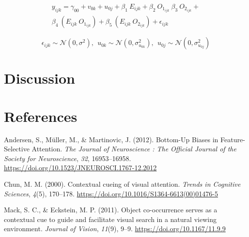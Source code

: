 \documentclass[
  man,floatsintext]{apa7}
\newlength{\cslhangindent}
\newlength{\cslentryspacingunit} %
\newenvironment{CSLReferences}[2] %
 {%
  \setlength{\parindent}{0pt}
  \ifodd #1
  \let\oldpar\par
  \def\par{\hangindent=\cslhangindent\oldpar}
  \fi
  \setlength{\parskip}{#2\cslentryspacingunit}
 }%
 {}
\begin{document}
\begin{equation}
\begin{gathered}
y_{ijk} = \gamma_{00} + v_{0k} + u_{0j} + 
\beta_1~E_{ijk}+ \beta_2~O_{1_{ijk}}~ \beta_3~O_{2_{ijk}} + \\
\beta_4 ~ (E_{ijk}~O_{1_{ijk}}) + \beta_5~(E_{ijk} ~O_{2_{ijk}}) +  
\epsilon_{ijk}
\end{gathered}
\end{equation}

\[\epsilon_{ijk} \sim \mathcal{N}(0, \sigma^2),~~ u_{0k} \sim \mathcal{N}(0, \sigma^2_{u_{0k}}),~~ u_{0j} \sim \mathcal{N}(0, \sigma^2_{u_{0j}})\]

\hypertarget{discussion}{%
\section{Discussion}\label{discussion}}

\newpage

\hypertarget{references}{%
\section{References}\label{references}}

\hypertarget{refs}{}
\begin{CSLReferences}{1}{0}
\leavevmode{}%
Andersen, S., Müller, M., \& Martinovic, J. (2012). Bottom-{Up} {Biases} in {Feature}-{Selective} {Attention}. \emph{The Journal of Neuroscience : The Official Journal of the Society for Neuroscience}, \emph{32}, 16953--16958. \url{https://doi.org/10.1523/JNEUROSCI.1767-12.2012}

\leavevmode{}%
Chun, M. M. (2000). Contextual cueing of visual attention. \emph{Trends in Cognitive Sciences}, \emph{4}(5), 170--178. \url{https://doi.org/10.1016/S1364-6613(00)01476-5}

\leavevmode{}%
Mack, S. C., \& Eckstein, M. P. (2011). Object co-occurrence serves as a contextual cue to guide and facilitate visual search in a natural viewing environment. \emph{Journal of Vision}, \emph{11}(9), 9--9. \url{https://doi.org/10.1167/11.9.9}

\end{CSLReferences}

\newpage

\hypertarget{appendix-appendix}{%
\appendix}
\end{document}
